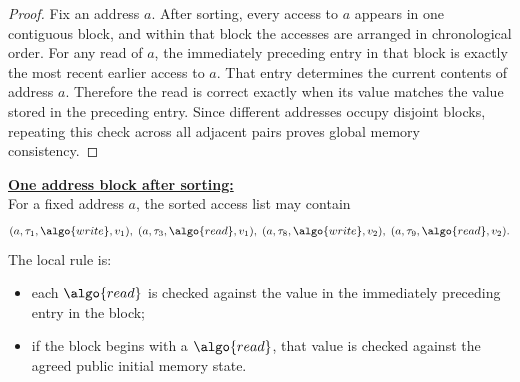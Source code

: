 \documentclass[11pt]{article}
\begin{document}
\begin{proof}
Fix an address $a$. After sorting, every access to $a$ appears in one contiguous block, and within that block the accesses are arranged in chronological order. For any read of $a$, the immediately preceding entry in that block is exactly the most recent earlier access to $a$. That entry determines the current contents of address $a$. Therefore the read is correct exactly when its value matches the value stored in the preceding entry. Since different addresses occupy disjoint blocks, repeating this check across all adjacent pairs proves global memory consistency.
\end{proof}

\begin{graybox}
\textbf{\underline{One address block after sorting:}}\\
For a fixed address $a$, the sorted access list may contain
\[
  (a, \tau_1, \algo{write}, v_1),\;
  (a, \tau_3, \algo{read}, v_1),\;
  (a, \tau_8, \algo{write}, v_2),\;
  (a, \tau_9, \algo{read}, v_2).
\]
The local rule is:
\begin{itemize}[leftmargin=2em, topsep=2pt, itemsep=0pt]
  \item each $\algo{read}$ is checked against the value in the immediately preceding entry in the block;
  \item if the block begins with a $\algo{read}$, that value is checked against the agreed public initial memory state.
\end{itemize}
\end{graybox}
\end{document}
